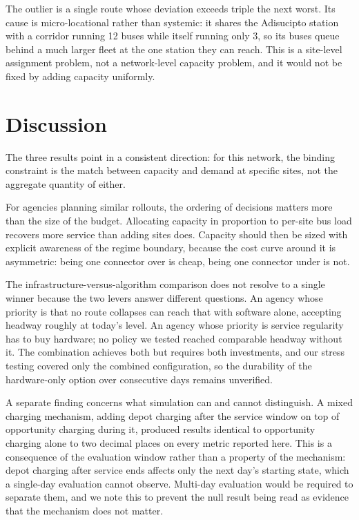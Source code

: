 \documentclass[conference]{IEEEtran}
\begin{document}
The outlier is a single route whose deviation exceeds triple the next
worst. Its cause is micro-locational rather than systemic: it shares the
Adisucipto station with a corridor running 12 buses while itself running
only 3, so its buses queue behind a much larger fleet at the one station
they can reach. This is a site-level assignment problem, not a
network-level capacity problem, and it would not be fixed by adding
capacity uniformly.

\section{Discussion}

The three results point in a consistent direction: for this network, the
binding constraint is the match between capacity and demand at specific
sites, not the aggregate quantity of either.

For agencies planning similar rollouts, the ordering of decisions matters
more than the size of the budget. Allocating capacity in proportion to
per-site bus load recovers more service than adding sites does. Capacity
should then be sized with explicit awareness of the regime boundary,
because the cost curve around it is asymmetric: being one connector over
is cheap, being one connector under is not.

The infrastructure-versus-algorithm comparison does not resolve to a
single winner because the two levers answer different questions. An
agency whose priority is that no route collapses can reach that with
software alone, accepting headway roughly at today's level. An agency
whose priority is service regularity has to buy hardware; no policy we
tested reached comparable headway without it. The combination achieves
both but requires both investments, and our stress testing covered only
the combined configuration, so the durability of the hardware-only option
over consecutive days remains unverified.

A separate finding concerns what simulation can and cannot distinguish. A
mixed charging mechanism, adding depot charging after the service window
on top of opportunity charging during it, produced results identical to
opportunity charging alone to two decimal places on every metric reported
here. This is a consequence of the evaluation window rather than a
property of the mechanism: depot charging after service ends affects only
the next day's starting state, which a single-day evaluation cannot
observe. Multi-day evaluation would be required to separate them, and we
note this to prevent the null result being read as evidence that the
mechanism does not matter.
\end{document}
